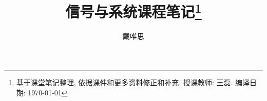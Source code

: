\documentclass[10pt]{article}
\title{信号与系统课程笔记\footnote{\rm 基于课堂笔记整理, 依据课件和更多资料修正和补充. 授课教师: 王磊. 编译日期: \today}}
\date{}
\author{戴唯思}
\begin{document}
\sf\maketitle\rm

%






\end{document}
